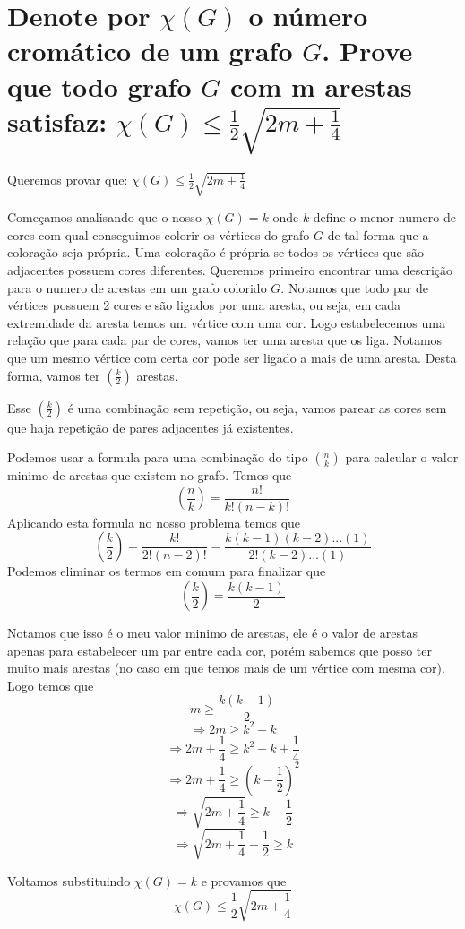 \documentclass[a4paper,12pt]{article}
\begin{document}
\section{Denote por $\chi(G)$ o número cromático de um grafo $G$. Prove que todo grafo $G$ com m arestas satisfaz: $\chi(G) \leq \frac{1}{2} \sqrt{2m + \frac{1}{4}}$}

	Queremos provar que: $\chi(G) \leq \frac{1}{2} \sqrt{2m + \frac{1}{4}}$
	
	Começamos analisando que o nosso $\chi(G) = k$ onde $k$ define o menor numero de cores com qual conseguimos colorir os vértices do grafo $G$ de tal forma que a coloração seja própria. Uma coloração é própria se todos os vértices que são adjacentes possuem cores diferentes. Queremos primeiro encontrar uma descrição para o numero de arestas em um grafo colorido $G$. Notamos que todo par de vértices possuem 2 cores e são ligados por uma aresta, ou seja, em cada extremidade da aresta temos um vértice com uma cor. Logo estabelecemos uma relação que para cada par de cores, vamos ter uma aresta que os liga. Notamos que um mesmo vértice com certa cor pode ser ligado a mais de uma aresta. Desta forma, vamos ter $\left(\frac{k}{2}\right)$ arestas.
	
	Esse $\left(\frac{k}{2}\right)$ é uma combinação sem repetição, ou seja, vamos parear as cores sem que haja repetição de pares adjacentes já existentes.
	
	Podemos usar a formula para uma combinação do tipo $\left(\frac{n}{k}\right)$ para calcular o valor minimo de arestas que existem no grafo. Temos que $$\left(\frac{n}{k}\right) = \frac{n!}{k! (n - k)!}$$
	Aplicando esta formula no nosso problema temos que $$\left(\frac{k}{2}\right) = \frac{k!}{2! (n - 2)!} = \frac{k (k - 1) (k - 2) ... (1)}{2! (k - 2) ... (1)}$$ Podemos eliminar os termos em comum para finalizar que $$\left(\frac{k}{2}\right) = \frac{k (k - 1)}{2}$$
	
	Notamos que isso é o meu valor minimo de arestas, ele é o valor de arestas apenas para estabelecer um par entre cada cor, porém sabemos que posso ter muito mais arestas (no caso em que temos mais de um vértice com mesma cor). Logo temos que
	$$m \geq \frac{k(k - 1)}{2}$$
	$$\Rightarrow 2m \geq k^2 - k$$
	$$\Rightarrow 2m + \frac{1}{4} \geq k^2 - k + \frac{1}{4}$$
	$$\Rightarrow 2m + \frac{1}{4} \geq \left( k - \frac{1}{2}\right)^2$$
	$$\Rightarrow \sqrt{2m + \frac{1}{4}} \geq k - \frac{1}{2}$$
	$$\Rightarrow \sqrt{2m + \frac{1}{4}} + \frac{1}{2} \geq k$$
	
	Voltamos substituindo $\chi(G) = k$ e provamos que $$\chi(G) \leq \frac{1}{2} \sqrt{2m + \frac{1}{4}}$$
\end{document}
